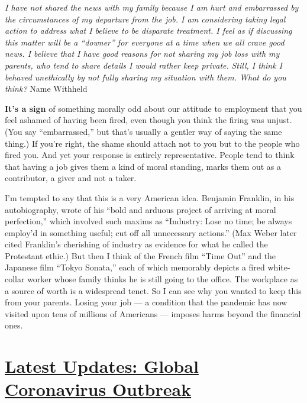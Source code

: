 \emph{I have not shared the news with my family because I am hurt and
embarrassed by the circumstances of my departure from the job. I am
considering taking legal action to address what I believe to be
disparate treatment. I feel as if discussing this matter will be a
``downer'' for everyone at a time when we all crave good news. I believe
that I have good reasons for not sharing my job loss with my parents,
who tend to share details I would rather keep private.} \emph{Still, I
think I behaved unethically by not fully sharing my situation with them.
What do you think?} Name Withheld

\textbf{It's a sign} of something morally odd about our attitude to
employment that you feel ashamed of having been fired, even though you
think the firing was unjust. (You say ``embarrassed,'' but that's
usually a gentler way of saying the same thing.) If you're right, the
shame should attach not to you but to the people who fired you. And yet
your response is entirely representative. People tend to think that
having a job gives them a kind of moral standing, marks them out as a
contributor, a giver and not a taker.

I'm tempted to say that this is a very American idea. Benjamin Franklin,
in his autobiography, wrote of his ``bold and arduous project of
arriving at moral perfection,'' which involved such maxims as
``Industry: Lose no time; be always employ'd in something useful; cut
off all unnecessary actions.'' (Max Weber later cited Franklin's
cherishing of industry as evidence for what he called the Protestant
ethic.) But then I think of the French film ``Time Out'' and the
Japanese film ``Tokyo Sonata,'' each of which memorably depicts a fired
white-collar worker whose family thinks he is still going to the office.
The workplace as a source of worth is a widespread tenet. So I can see
why you wanted to keep this from your parents. Losing your job --- a
condition that the pandemic has now visited upon tens of millions of
Americans --- imposes harms beyond the financial ones.

\hypertarget{latest-updates-global-coronavirus-outbreak}{%
\section{\texorpdfstring{\href{https://www.nytimes3xbfgragh.onion/2020/08/04/world/coronavirus-cases.html?action=click\&pgtype=Article\&state=default\&region=MAIN_CONTENT_1\&context=storylines_live_updates}{Latest
Updates: Global Coronavirus
Outbreak}}{Latest Updates: Global Coronavirus Outbreak}}\label{latest-updates-global-coronavirus-outbreak}}

